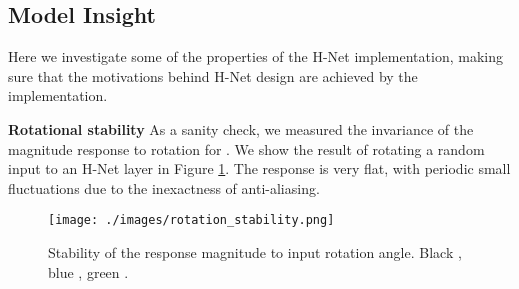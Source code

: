 \documentclass[10pt,twocolumn,letterpaper]{article}
\begin{document}
\subsection{Model Insight}
Here we investigate some of the properties of the H-Net implementation,
making sure that the motivations behind H-Net design are achieved by
the implementation.

\textbf{Rotational stability}
As a sanity check, we measured the invariance of the magnitude response to rotation for . We show the result of rotating a random input to an H-Net layer in Figure \ref{fig:stability}. The response is very flat, with periodic small fluctuations due to the inexactness of anti-aliasing.
\begin{figure}[t]
\begin{center}
	\texttt{[image: ./images/rotation\_stability.png]}
\end{center}
\vspace{-1em}
\caption{Stability of the response magnitude to input rotation angle. Black , blue , green .}
\label{fig:stability}
\vspace{-1em}
\end{figure}
\end{document}
